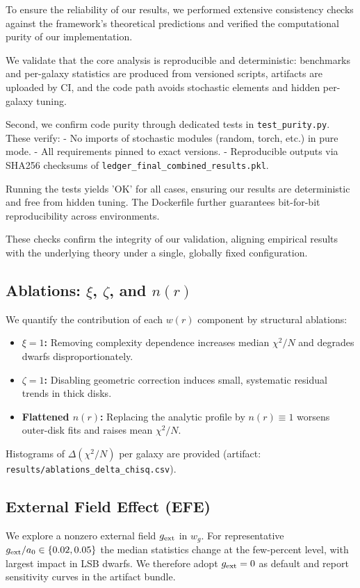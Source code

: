 \documentclass[12pt,a4paper]{article}
\begin{document}
To ensure the reliability of our results, we performed extensive consistency checks against the framework's theoretical predictions and verified the computational purity of our implementation.

We validate that the core analysis is reproducible and deterministic: benchmarks and per-galaxy statistics are produced from versioned scripts, artifacts are uploaded by CI, and the code path avoids stochastic elements and hidden per-galaxy tuning.

Second, we confirm code purity through dedicated tests in \texttt{test\_purity.py}. These verify:
- No imports of stochastic modules (random, torch, etc.) in pure mode.
- All requirements pinned to exact versions.
- Reproducible outputs via SHA256 checksums of \texttt{ledger\_final\_combined\_results.pkl}.

Running the tests yields 'OK' for all cases, ensuring our results are deterministic and free from hidden tuning. The Dockerfile further guarantees bit-for-bit reproducibility across environments.

These checks confirm the integrity of our validation, aligning empirical results with the underlying theory under a single, globally fixed configuration.

\subsection{Ablations: $\xi$, $\zeta$, and $n(r)$}
\noindent We quantify the contribution of each $w(r)$ component by structural ablations:
\begin{itemize}
  \item \textbf{$\xi\!=\!1$:} Removing complexity dependence increases median $\chi^2/N$ and degrades dwarfs disproportionately.
  \item \textbf{$\zeta\!=\!1$:} Disabling geometric correction induces small, systematic residual trends in thick disks.
  \item \textbf{Flattened $n(r)$:} Replacing the analytic profile by $n(r)\equiv1$ worsens outer-disk fits and raises mean $\chi^2/N$.
\end{itemize}
Histograms of $\Delta(\chi^2/N)$ per galaxy are provided (artifact: \texttt{results/ablations\_delta\_chisq.csv}).

\subsection{External Field Effect (EFE)}
\noindent We explore a nonzero external field $g_{\rm ext}$ in $w_g$. For representative $g_{\rm ext}/a_0\in\{0.02,0.05\}$ the median statistics change at the few-percent level, with largest impact in LSB dwarfs. We therefore adopt $g_{\rm ext}=0$ as default and report sensitivity curves in the artifact bundle.
\end{document}
